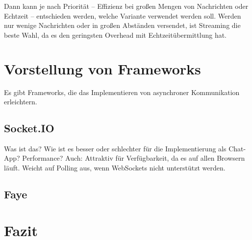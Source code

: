 \documentclass[sigplan, screen]{acmart}
\begin{document}
Dann kann je nach Priorität – Effizienz bei großen Mengen von Nachrichten oder Echtzeit – entschieden werden, welche Variante verwendet werden soll.
Werden nur wenige Nachrichten oder in großen Abständen versendet, ist Streaming die beste Wahl, da es den geringsten Overhead mit Echtzeitübermittlung hat.


\section{Vorstellung von Frameworks}

Es gibt Frameworks, die das Implementieren von asynchroner Kommunikation erleichtern.

\subsection{Socket.IO}

Was ist das? Wie ist es besser oder schlechter für die Implementierung als Chat-App? Performance?
Auch: Attraktiv für Verfügbarkeit, da es auf allen Browsern läuft. Weicht auf Polling aus, wenn WebSockets nicht unterstützt werden.

\subsection{Faye}

\section{Fazit}





\listoffigures
\listoftables
\end{document}
